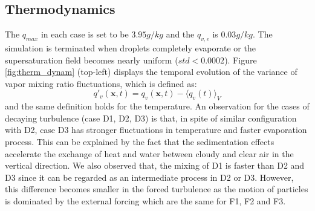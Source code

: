 \documentclass[12pt]{article}
\begin{document}
\subsection{Thermodynamics}
The $q_{max}$ in each case is set to be $3.95g/kg$ and the $q_{v,e}$ is $0.03g/kg$. The simulation is terminated when droplets completely evaporate or the supersaturation field becomes nearly uniform ($std<0.0002$). Figure \ref{fig:therm_dynam} (top-left) displays the temporal evolution of the variance of vapor mixing ratio fluctuations, which is defined as:
\[
q'_v(\mathbf{x},t) = q_v(\mathbf{x},t)-\langle q_v(t)\rangle_V
\]
and the same definition holds for the temperature. An observation for the cases of decaying turbulence (case D1, D2, D3) is that, in spite of similar configuration with D2, case D3 has stronger fluctuations in temperature and faster evaporation process. This can be explained by the fact that the sedimentation effects accelerate the exchange of heat and water between cloudy and clear air in the vertical direction. We also observed that, the mixing of D1 is faster than D2 and D3 since it can be regarded as an intermediate process in D2 or D3. However, this difference becomes smaller in the forced turbulence as the motion of particles is dominated by the external forcing which are the same for F1, F2 and F3.
\end{document}
